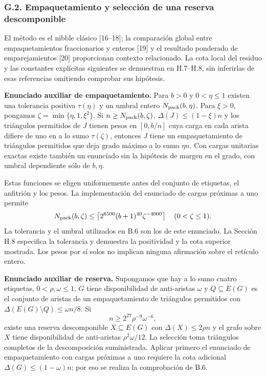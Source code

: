 \documentclass[spanish,11pt,a4paper]{article}
\begin{document}
\subsubsection{G.2. Empaquetamiento y selección de una reserva descomponible}\label{g.2.-empaquetamiento-y-selecciuxf3n-de-una-reserva-descomponible}

El método es el nibble clásico {[}16--18{]}; la comparación global entre empaquetamientos fraccionarios y enteros {[}19{]} y el resultado ponderado de emparejamientos {[}20{]} proporcionan contexto relacionado. La cota local del residuo y las constantes explícitas siguientes se demuestran en H.7--H.8, sin inferirlas de esas referencias omitiendo comprobar sus hipótesis.

\textbf{Enunciado auxiliar de empaquetamiento.} Para \(b>0\) y \(0<\eta\le1\) existen una tolerancia positiva \(\tau(\eta)\) y un umbral entero \(N_{\rm pack}(b,\eta)\). Para \(\xi>0\), pongamos \(\zeta=\min\{\eta,1,\xi^2\}\). Si \(n\ge N_{\rm pack}(b,\zeta)\), \(\Delta(J)\le(1-\xi)n\) y los triángulos permitidos de \(J\) tienen pesos en \([0,b/n]\) cuya carga en cada arista difiere de uno en a lo sumo \(\tau(\zeta)\), entonces \(J\) tiene un empaquetamiento de triángulos permitidos que deja grado máximo a lo sumo \(\eta n\). Con cargas unitarias exactas existe también un enunciado sin la hipótesis de margen en el grado, con umbral dependiente sólo de \(b,\eta\).

Estas funciones se eligen uniformemente antes del conjunto de etiquetas, el anfitrión y los pesos. La implementación del enunciado de cargas próximas a uno permite \[N_{\rm pack}(b,\zeta)\le
\left\lceil2^{6500}(b+1)^{40}\zeta^{-4000}\right\rceil
\quad(0<\zeta\le1).\] La tolerancia y el umbral utilizados en B.6 son los de este enunciado. La Sección H.8 especifica la tolerancia y demuestra la positividad y la cota superior mostrada. Los pesos por sí solos no implican ninguna afirmación sobre el retículo entero.

\textbf{Enunciado auxiliar de reserva.} Supongamos que hay a lo sumo cuatro etiquetas, \(0<\rho,\omega\le1\), \(G\) tiene disponibilidad de anti-aristas \(\omega\) y \(Q\subseteq E(G)\) es el conjunto de aristas de un empaquetamiento de triángulos permitidos con \(\Delta(E(G)\setminus Q)\le\omega n/8\). Si \[n\ge2^{27}\rho^{-9}\omega^{-6},\] existe una reserva descomponible \(X\subseteq E(G)\) con \(\Delta(X)\le2\rho n\) y el grafo sobre \(X\) tiene disponibilidad de anti-aristas \(\rho^2\omega/12\). La selección toma triángulos completos de la descomposición suministrada. Aplicar primero el enunciado de empaquetamiento con cargas próximas a uno requiere la cota adicional \(\Delta(G)\le(1-\omega)n\); por eso se realiza la comprobación de B.6.
\end{document}
